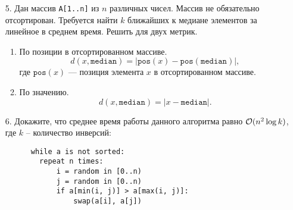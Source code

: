 \begin{enumerate}
  \item[5.]
    Дан массив \texttt{A[1..n]} из $n$ различных чисел. Массив не обязательно отсортирован.
    Требуется найти $k$ ближайших к медиане элементов за линейное в среднем время. Решить для двух метрик.
    \begin{enumerate}
      \item По позиции в отсортированном массиве.
         $$d(x, \texttt{median}) = |\texttt{pos}(x) - \texttt{pos}(\texttt{median})|,$$
         где $\texttt{pos}(x)$ --- позиция элемента $x$ в отсортированном массиве.

      \item По значению.
         $$d(x, \texttt{median}) = |x - \texttt{median}|.$$
    \end{enumerate}

  \item[6.] 
    Докажите, что среднее время работы данного алгоритма равно $\mathcal{O}(n^2 \log k)$, где $k$ -- количество инверсий:
    \begin{verbatim}
      while a is not sorted:
        repeat n times:
            i = random in [0..n)
            j = random in [0..n)
            if a[min(i, j)] > a[max(i, j)]:
                swap(a[i], a[j])
    \end{verbatim}

\end{enumerate}	
